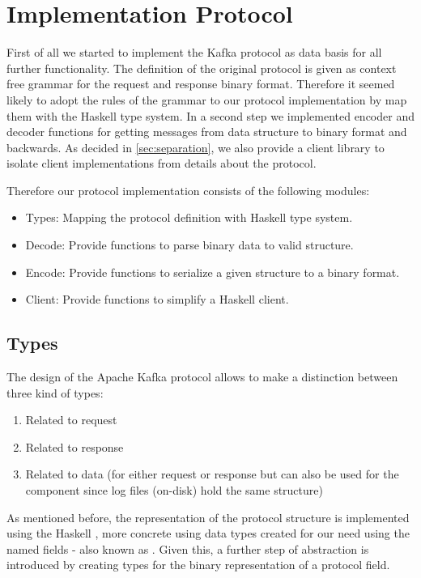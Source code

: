 \chapter{Implementation Protocol}
\label{sec-protocol}
First of all we started to implement the Kafka protocol 
as data basis for all further functionality. The definition of the original
protocol is given as context free grammar for the request and response binary
format. Therefore it seemed likely to adopt the rules of the grammar to our
protocol implementation by map them with the Haskell type system. In a second
step we implemented encoder and decoder functions for getting messages from data
structure to binary format and backwards. As decided in \ref{sec:separation}, we
also provide a client library to isolate client implementations from details
about the protocol. 

Therefore our protocol implementation consists of the following modules: 
\begin{itemize}
    \item {Types: Mapping the protocol definition with Haskell type system. }
    \item {Decode: Provide functions to parse binary data to valid structure. }
    \item {Encode: Provide functions to serialize a given structure to a binary
        format. }
    \item {Client: Provide functions to simplify a Haskell client.}
\end{itemize}

\section{Types}
The design of the Apache Kafka protocol allows to make a distinction between three kind of types:
\begin{enumerate}
  \item Related to request
  \item Related to response
  \item Related to data (for either request or response but can also be used for the  component since log files (on-disk) hold the same structure)
\end{enumerate}

As mentioned before, the representation of the protocol structure is implemented using the Haskell , more concrete using data types created
for our need using the named fields - also known as . Given this, a
further step of abstraction is introduced by creating types for the binary
representation of a protocol field. 

